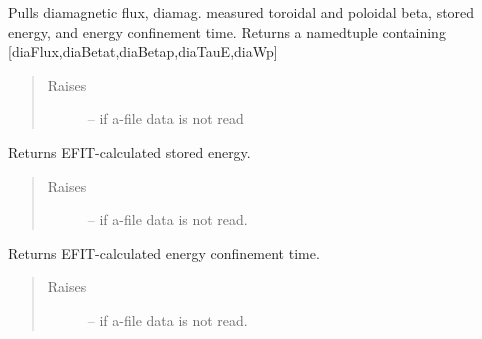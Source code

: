 \documentclass[letterpaper,10pt,english]{sphinxmanual}
\begin{document}
\begin{fulllineitems}

\begin{fulllineitems}
\label{eqtools:eqtools.eqdskreader.EqdskReader.getDiamag}
Pulls diamagnetic flux, diamag. measured toroidal and poloidal beta, stored energy, and energy confinement time.
Returns a namedtuple containing {[}diaFlux,diaBetat,diaBetap,diaTauE,diaWp{]}
\begin{quote}\begin{description}
\item[{Raises }] \leavevmode
{} -- 
if a-file data is not read

\end{description}\end{quote}

\end{fulllineitems}


\begin{fulllineitems}
\label{eqtools:eqtools.eqdskreader.EqdskReader.getWMHD}
Returns EFIT-calculated stored energy.
\begin{quote}\begin{description}
\item[{Raises }] \leavevmode
{} -- 
if a-file data is not read.

\end{description}\end{quote}

\end{fulllineitems}


\begin{fulllineitems}
\label{eqtools:eqtools.eqdskreader.EqdskReader.getTauMHD}
Returns EFIT-calculated energy confinement time.
\begin{quote}\begin{description}
\item[{Raises }] \leavevmode
{} -- 
if a-file data is not read.

\end{description}\end{quote}

\end{fulllineitems}


\end{fulllineitems}
\end{document}
